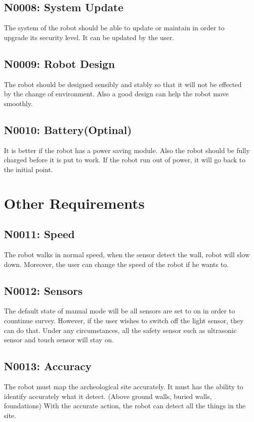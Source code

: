 \documentclass[11pt, a4paper]{report}
\begin{document}
\subsection{N0008: System Update }
The system of the robot should be able to update or maintain in order to upgrade its security level. It can be updated by the user.


\subsection{N0009: Robot Design}
The robot should be designed sensibly and stably so that it will not be effected by the change of environment. Also a good design can help the robot move smoothly.


\subsection{N0010: Battery(Optinal)}
It is better if the robot has a power saving module. Also the robot should be fully charged before it is put to work. If the robot run out of power, it will go back to the initial point.



\section{Other Requirements}
\subsection{N0011: Speed}
The robot walks in normal speed, when the sensor detect the wall, robot will slow down. Moreover, the user can change the speed of the robot if he wants to.

\subsection{N0012: Sensors}
The default state of manual mode will be all sensors are set to on in order to countinue survey. However, if the user wishes to switch off the light sensor, they can do that. Under any circumstances, all the safety sensor such as ultrasonic sensor and touch sensor will stay on. 


\subsection{N0013: Accuracy}
The robot must map the archeological site accurately. It must has the ability to identify accurately
what it detect. (Above ground walls, buried walls, foundations)  With the accurate action, the robot can detect all the things in the site.
\end{document}
